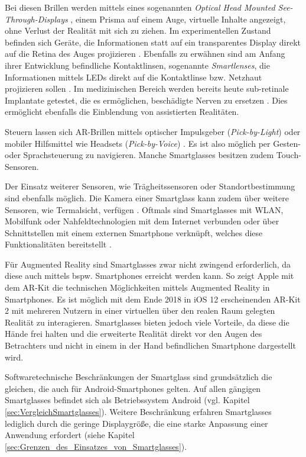 Bei diesen Brillen werden mittels eines sogenannten \emph{Optical Head Mounted See-Through-Displays} \cite[S.~26]{Schwenke2016}, einem Prisma auf einem Auge, virtuelle Inhalte angezeigt, ohne Verlust der Realität mit sich zu ziehen. Im experimentellen Zustand befinden sich Geräte, die Informationen statt auf ein transparentes Display direkt auf die Retina des Auges projizieren \cite[S.~241]{Broll2013}. Ebenfalls zu erwähnen sind am Anfang ihrer Entwicklung befindliche Kontaktlinsen, sogenannte \emph{Smartlenses}, die Informationen mittels LEDs direkt auf die Kontaktlinse bzw. Netzhaut projizieren sollen \cite{Donath2014, Schwan2014}. Im medizinischen Bereich werden bereits heute sub-retinale Implantate getestet, die es ermöglichen, beschädigte Nerven zu ersetzen \cite{Young2013}. Dies ermöglicht ebenfalls die Einblendung von assistierten Realitäten.

Steuern lassen sich AR-Brillen mittels optischer Impulsgeber (\emph{Pick-by-Light}) oder mobiler Hilfsmittel wie Headsets (\emph{Pick-by-Voice}) \cite{INTRALOGISTIK2016}. Es ist also möglich per Gesten- oder Sprachsteuerung zu navigieren. Manche Smartglasses besitzen zudem Touch-Sensoren.

Der Einsatz weiterer Sensoren, wie Trägheitssensoren oder Standortbestimmung sind ebenfalls möglich. Die Kamera einer Smartglass kann zudem über weitere Sensoren, wie Termalsicht, verfügen \cite[S.~27]{Schwenke2016}. Oftmals sind Smartglasses mit WLAN, Mobilfunk oder Nahfeldtechnologien mit dem Internet verbunden oder über Schnittstellen mit einem externen Smartphone verknüpft, welches diese Funktionalitäten bereitstellt \cite[S.~28]{Schwenke2016}.

Für Augmented Reality sind Smartglasses zwar nicht zwingend erforderlich, da diese auch mittels bspw. Smartphones erreicht werden kann. So zeigt Apple mit dem AR-Kit \cite{Apple2018} die technischen Möglichkeiten mittels Augmented Reality in Smartphones. Es ist möglich mit dem Ende 2018 in iOS 12 erscheinenden AR-Kit 2 mit mehreren Nutzern in einer virtuellen über den realen Raum gelegten Realität zu interagieren. Smartglasses bieten jedoch viele Vorteile, da diese die Hände frei halten und die erweiterte Realität direkt vor den Augen des Betrachters und nicht in einem in der Hand befindlichen Smartphone dargestellt wird.

Softwaretechnische Beschränkungen der Smartglass sind grundsätzlich die gleichen, die auch für Android-Smartphones gelten. Auf allen gängigen Smartglasses befindet sich als Betriebssystem Android (vgl. Kapitel \ref{sec:VergleichSmartglasses}). Weitere Beschränkung erfahren Smartglasses lediglich durch die geringe Displaygröße, die eine starke Anpassung einer Anwendung erfordert (siehe Kapitel \ref{sec:Grenzen_des_Einsatzes_von_Smartglasses}).
%
%
%
%
%
%

